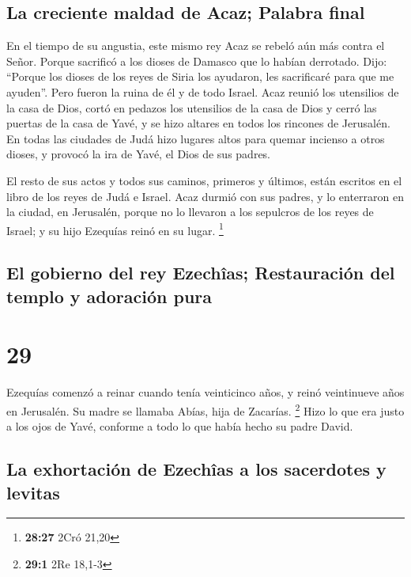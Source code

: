 \hypertarget{la-creciente-maldad-de-acaz-palabra-final}{%
\subsection{La creciente maldad de Acaz; Palabra
final}\label{la-creciente-maldad-de-acaz-palabra-final}}

 En el tiempo de su angustia, este mismo rey Acaz se
rebeló aún más contra el Señor.  Porque sacrificó a los
dioses de Damasco que lo habían derrotado. Dijo: ``Porque los dioses de
los reyes de Siria los ayudaron, les sacrificaré para que me ayuden''.
Pero fueron la ruina de él y de todo Israel.  Acaz reunió
los utensilios de la casa de Dios, cortó en pedazos los utensilios de la
casa de Dios y cerró las puertas de la casa de Yavé, y se hizo altares
en todos los rincones de Jerusalén.  En todas las
ciudades de Judá hizo lugares altos para quemar incienso a otros dioses,
y provocó la ira de Yavé, el Dios de sus padres.

 El resto de sus actos y todos sus caminos, primeros y
últimos, están escritos en el libro de los reyes de Judá e Israel.
 Acaz durmió con sus padres, y lo enterraron en la
ciudad, en Jerusalén, porque no lo llevaron a los sepulcros de los reyes
de Israel; y su hijo Ezequías reinó en su lugar. \footnote{\textbf{28:27}
  2Cró 21,20}

\hypertarget{el-gobierno-del-rey-ezechuxeeas-restauraciuxf3n-del-templo-y-adoraciuxf3n-pura}{%
\subsection{El gobierno del rey Ezechîas; Restauración del templo y
adoración
pura}\label{el-gobierno-del-rey-ezechuxeeas-restauraciuxf3n-del-templo-y-adoraciuxf3n-pura}}

\hypertarget{section-28}{%
\section{29}\label{section-28}}

 Ezequías comenzó a reinar cuando tenía veinticinco años,
y reinó veintinueve años en Jerusalén. Su madre se llamaba Abías, hija
de Zacarías. \footnote{\textbf{29:1} 2Re 18,1-3}  Hizo lo
que era justo a los ojos de Yavé, conforme a todo lo que había hecho su
padre David.

\hypertarget{la-exhortaciuxf3n-de-ezechuxeeas-a-los-sacerdotes-y-levitas}{%
\subsection{La exhortación de Ezechîas a los sacerdotes y
levitas}\label{la-exhortaciuxf3n-de-ezechuxeeas-a-los-sacerdotes-y-levitas}}

